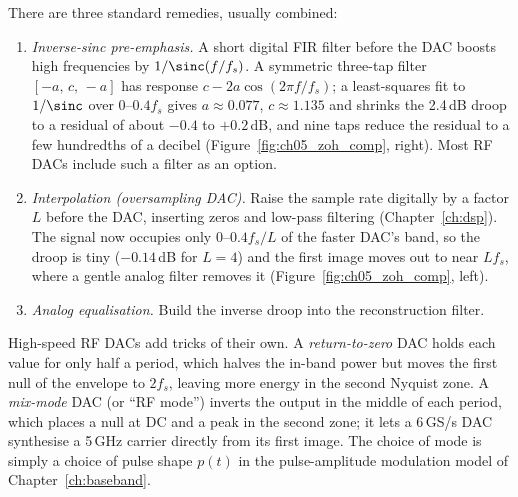 
There are three standard remedies, usually combined:
\begin{enumerate}
\item \emph{Inverse-sinc pre-emphasis.} A short digital FIR filter before the DAC boosts
high frequencies by $1/\sinc(f/f_s)$. A symmetric three-tap filter $[-a,\,c,\,-a]$ has
response $c-2a\cos(2\pi f/f_s)$; a least-squares fit to $1/\sinc$ over $0$--$0.4f_s$ gives
$a\approx0.077$, $c\approx1.135$ and shrinks the 2.4\,dB droop to a residual of about $-0.4$ to
$+0.2$\,dB, and nine taps reduce
the residual to a few hundredths of a decibel (Figure~\ref{fig:ch05_zoh_comp}, right). Most
RF DACs include such a filter as an option.
\item \emph{Interpolation (oversampling DAC).} Raise the sample rate digitally by a factor
$L$ before the DAC, inserting zeros and low-pass filtering (Chapter~\ref{ch:dsp}). The signal
now occupies only $0$--$0.4f_s/L$ of the faster DAC's band, so the droop is tiny
($-0.14$\,dB for $L=4$) and the first image moves out to near $Lf_s$, where a gentle analog
filter removes it (Figure~\ref{fig:ch05_zoh_comp}, left).
\item \emph{Analog equalisation.} Build the inverse droop into the reconstruction filter.
\end{enumerate}

High-speed RF DACs add tricks of their own. A \emph{return-to-zero} DAC holds each value for
only half a period, which halves the in-band power but moves the first null of the envelope to
$2f_s$, leaving more energy in the second Nyquist zone. A \emph{mix-mode} DAC (or ``RF
mode'') inverts the output in the middle of each period, which places a null at DC and a
peak in the second zone; it lets a 6\,GS/s DAC synthesise a 5\,GHz carrier directly from
its first image. The choice of mode is simply a choice of pulse shape $p(t)$ in the
pulse-amplitude modulation model of Chapter~\ref{ch:baseband}.


